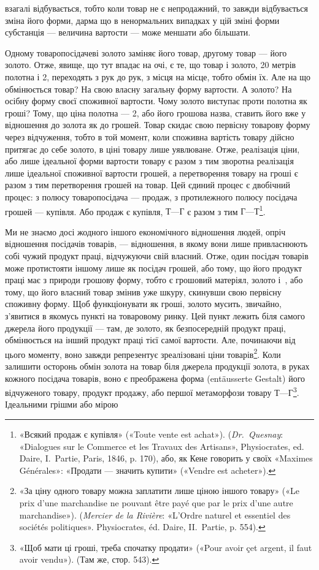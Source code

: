 \parcont{}  %
взагалі відбувається, тобто коли товар не є непродажний, то
завжди відбувається зміна його форми, дарма що в ненормальних
випадках у цій зміні форми субстанція — величина вартости —
може меншати або більшати.

Одному товаропосідачеві золото заміняє його товар, другому
товар — його золото. Отже, явище, що тут впадає на очі, є те, що
товар і золото, 20 метрів полотна і 2, переходять
з рук до рук, з місця на місце, тобто обмін їх. Але на що обмінюється
товар? На свою власну загальну форму вартости. А золото?
На осібну форму своєї споживної вартости. Чому золото
виступає проти полотна як гроші? Тому, що ціна полотна —
2, або його грошова назва, ставить його вже у
відношення до золота як до грошей. Товар скидає свою первісну
товарову форму через відчуження, тобто в той момент, коли споживна
вартість товару дійсно притягає до себе золото, в ціні товару
лише уявлюване. Отже, реалізація ціни, або лише ідеальної форми
вартости товару є разом з тим зворотна реалізація лише ідеальної
споживної вартости грошей, а перетворення товару на гроші є
разом з тим перетворення грошей на товар. Цей єдиний процес
є двобічний процес: з полюсу товаропосідача — продаж, з протилежного
полюсу посідача грошей — купівля. Або продаж є купівля,
$Т — Г$ є разом з тим $Г — Т$\footnote{
«Всякий продаж є купівля» («Toute vente est achat»). (\emph{Dr.~Quesnay}:
«Dialogues sur le Commerce et les Travaux des Artisans», Physiocrates,
ed. Daire, I.~Partie, Paris, 1846, p. 170), або, як Кене говорить у своїх
«Maximes Générales»: «Продати — значить купити» («Vendre est acheter»).
}.

Ми не знаємо досі жодного іншого економічного відношення
людей, опріч відношення посідачів товарів, — відношення, в
якому вони лише привласнюють собі чужий продукт праці, відчужуючи
свій власний. Отже, один посідач товарів може протистояти
іншому лише як посідач грошей, або тому, що його продукт
праці має з природи грошову форму, тобто є грошовий матеріял,
золото і~, або тому, що його власний товар змінив уже
шкуру, скинувши свою первісну споживну форму. Щоб функціонувати
як гроші, золото мусить, звичайно, з’явитися в якомусь
пункті на товаровому ринку. Цей пункт лежить біля самого
джерела його продукції — там, де золото, як безпосередній продукт
праці, обмінюється на інший продукт праці тієї самої вартости.
Але, починаючи від цього моменту, воно завжди репрезентує
зреалізовані ціни товарів\footnote{
«За ціну одного товару можна заплатити лише ціною іншого товару»
(«Le prix d’une marchandise ne pouvant être payé que par le prix
d’une autre marchandise»). (\emph{Mercier de la Rivière}: «L’Ordre naturel et
essentiel des sociétés politiques». Physiocrates, éd. Daire, II.~Partie, p. 554).
}. Коли залишити осторонь
обмін золота на товар біля джерела продукції золота, в руках
кожного посідача товарів, воно є преображена форма (entäusserte
Gestalt) його відчуженого товару, продукт продажу, або першої
метаморфози товару $Т — Г$\footnote{
«Щоб мати ці гроші, треба спочатку продати» («Pour avoir çet
argent, il faut avoir vendu»). (Там же, стор. 543).
}. Ідеальними грішми або мірою
\parbreak{}  %
